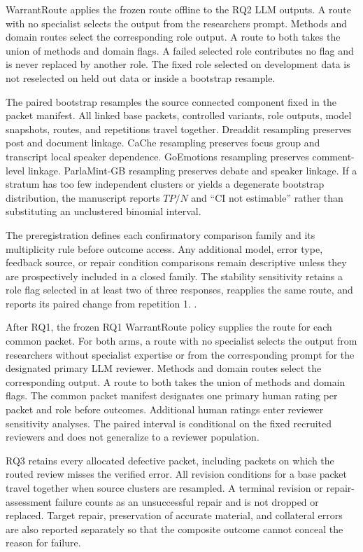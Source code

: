 WarrantRoute applies the frozen route offline to the RQ2 LLM outputs. A route with no specialist selects the output from the researchers prompt. Methods and domain routes select the corresponding role output. A route to both takes the union of methods and domain flags. A failed selected role contributes no flag and is never replaced by another role. The fixed role selected on development data is not reselected on held out data or inside a bootstrap resample.

The paired bootstrap resamples the source connected component fixed in the packet manifest. All linked base packets, controlled variants, role outputs, model snapshots, routes, and repetitions travel together. Dreaddit resampling preserves post and document linkage. CaChe resampling preserves focus group and transcript local speaker dependence. GoEmotions resampling preserves comment-level linkage. ParlaMint-GB resampling preserves debate and speaker linkage. If a stratum has too few independent clusters or yields a degenerate bootstrap distribution, the manuscript reports \(TP/N\) and ``CI not estimable'' rather than substituting an unclustered binomial interval.

The preregistration defines each confirmatory comparison family and its multiplicity rule before outcome access. Any additional model, error type, feedback source, or repair condition comparisons remain descriptive unless they are prospectively included in a closed family. The stability sensitivity retains a role flag selected in at least two of three responses, reapplies the same route, and reports its paired change from repetition 1. .

After RQ1, the frozen RQ1 WarrantRoute policy supplies the route for each common packet. For both arms, a route with no specialist selects the output from researchers without specialist expertise or from the corresponding prompt for the designated primary LLM reviewer. Methods and domain routes select the corresponding output. A route to both takes the union of methods and domain flags. The common packet manifest designates one primary human rating per packet and role before outcomes. Additional human ratings enter reviewer sensitivity analyses. The paired interval is conditional on the fixed recruited reviewers and does not generalize to a reviewer population.

RQ3 retains every allocated defective packet, including packets on which the routed review misses the verified error. All revision conditions for a base packet travel together when source clusters are resampled. A terminal revision or repair-assessment failure counts as an unsuccessful repair and is not dropped or replaced. Target repair, preservation of accurate material, and collateral errors are also reported separately so that the composite outcome cannot conceal the reason for failure.

